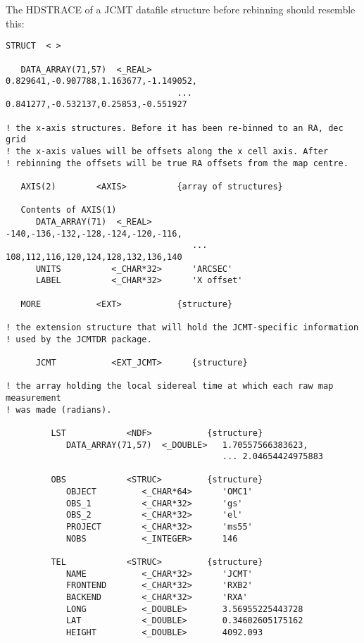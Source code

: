 The HDSTRACE of a JCMT datafile structure before rebinning should
resemble this:
\begin{small}
\begin{verbatim}
STRUCT  < >

   DATA_ARRAY(71,57)  <_REAL>     0.829641,-0.907788,1.163677,-1.149052,
                                  ... 0.841277,-0.532137,0.25853,-0.551927

! the x-axis structures. Before it has been re-binned to an RA, dec grid
! the x-axis values will be offsets along the x cell axis. After
! rebinning the offsets will be true RA offsets from the map centre.

   AXIS(2)        <AXIS>          {array of structures}

   Contents of AXIS(1)
      DATA_ARRAY(71)  <_REAL>        -140,-136,-132,-128,-124,-120,-116,
                                     ... 108,112,116,120,124,128,132,136,140
      UNITS          <_CHAR*32>      'ARCSEC'
      LABEL          <_CHAR*32>      'X offset'

   MORE           <EXT>           {structure}

! the extension structure that will hold the JCMT-specific information
! used by the JCMTDR package.

      JCMT           <EXT_JCMT>      {structure}

! the array holding the local sidereal time at which each raw map measurement
! was made (radians).

         LST            <NDF>           {structure}
            DATA_ARRAY(71,57)  <_DOUBLE>   1.70557566383623,
                                           ... 2.04654424975883

         OBS            <STRUC>         {structure}
            OBJECT         <_CHAR*64>      'OMC1'
            OBS_1          <_CHAR*32>      'gs'
            OBS_2          <_CHAR*32>      'el'
            PROJECT        <_CHAR*32>      'ms55'
            NOBS           <_INTEGER>      146

         TEL            <STRUC>         {structure}
            NAME           <_CHAR*32>      'JCMT'
            FRONTEND       <_CHAR*32>      'RXB2'
            BACKEND        <_CHAR*32>      'RXA'
            LONG           <_DOUBLE>       3.56955225443728
            LAT            <_DOUBLE>       0.34602605175162
            HEIGHT         <_DOUBLE>       4092.093


\end{verbatim}
\end{small}
